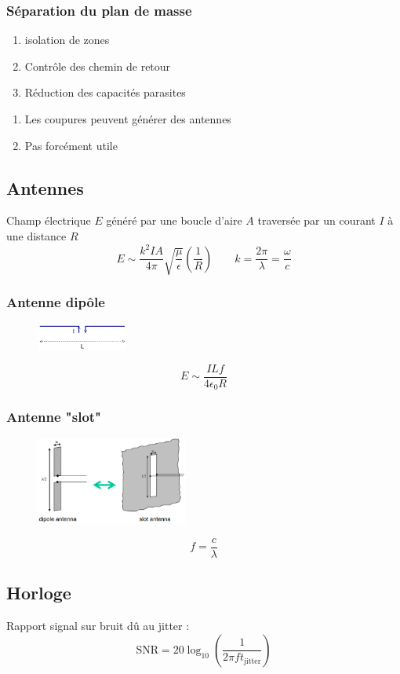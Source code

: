 \documentclass[resume]{subfiles}
\begin{document}
\begin{multicols}{3}
\subsubsection{Séparation du plan de masse}
\begin{multicols}{2}
\begin{enumerate}[label={+}]
\item isolation de zones
\item Contrôle des chemin de retour 
\item Réduction des capacités parasites
\end{enumerate}
\begin{enumerate}[label={-}]
\item Les coupures peuvent générer des antennes
\item Pas forcément utile
\end{enumerate}
\end{multicols}

\subsection{Antennes}
Champ électrique $E$ généré par une boucle d'aire $A$ traversée par un courant $I$ à une distance $R$
$$E\sim \frac{k^2 IA}{4\pi}\sqrt{\frac{\mu}{\epsilon}}\left(\frac{1}{R}\right)\qquad k=\frac{2\pi}{\lambda}=\frac{\omega}{c}$$
\subsubsection{Antenne dipôle}
\begin{figure}[H]
\centering
\includegraphics[width=3.00cm]{img_5.png}
\end{figure}
$$E\sim \frac{ILf}{4\epsilon_0 R}$$
\subsubsection{Antenne "slot"}
\begin{figure}[H]
\centering
\includegraphics[width=5.00cm]{img_6.png}
\end{figure}
$$f=\frac{c}{\lambda}$$
\subsection{Horloge}
Rapport signal sur bruit dû au jitter :
$$\text{SNR}=20\log_{10}\left(\frac{1}{2\pi ft_\text{jitter}}\right)$$


\end{multicols}
\end{document}
